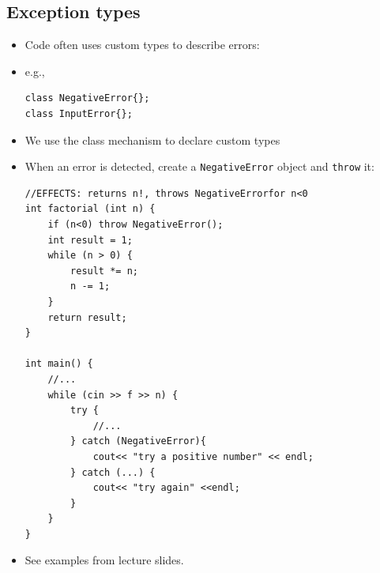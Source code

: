 \subsection{Exception types}
\begin{itemize}
	\item Code often uses custom types to describe errors:
	\item e.g.,
\begin{lstlisting}[style=C++]
class NegativeError{};
class InputError{};
\end{lstlisting}
	\item We use the class mechanism to declare custom types
	\item When an error is detected, create a \lstinline[style=C++]{NegativeError} object and \lstinline[style=C++]{throw} it:
\begin{lstlisting}[style=C++]
//EFFECTS: returns n!, throws NegativeErrorfor n<0
int factorial (int n) {
	if (n<0) throw NegativeError();
	int result = 1;
	while (n > 0) {
		result *= n;
		n -= 1;
	}
	return result;
}

int main() {
	//...
	while (cin >> f >> n) {
		try {
			//...
		} catch (NegativeError){
			cout<< "try a positive number" << endl;
		} catch (...) {
			cout<< "try again" <<endl;
		}
	}
}
\end{lstlisting}
	\item See examples from lecture slides.
\end{itemize}